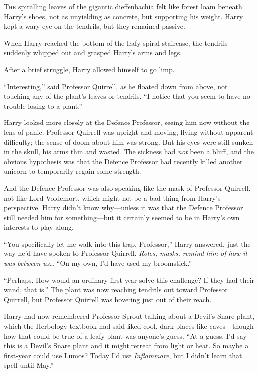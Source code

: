 
\lettrine{T}{he} spiralling leaves of the gigantic dieffenbachia felt like forest loam beneath Harry’s shoes, not as unyielding as concrete, but supporting his weight. Harry kept a wary eye on the tendrils, but they remained passive.

When Harry reached the bottom of the leafy spiral staircase, the tendrils suddenly whipped out and grasped Harry’s arms and legs.

After a brief struggle, Harry allowed himself to go limp.

“Interesting,” said Professor Quirrell, as he floated down from above, not touching any of the plant’s leaves or tendrils. “I notice that you seem to have no trouble losing to a plant.”

Harry looked more closely at the Defence Professor, seeing him now without the lens of panic. Professor Quirrell was upright and moving, flying without apparent difficulty; the sense of doom about him was strong. But his eyes were still sunken in the skull, his arms thin and wasted. The sickness had \emph{not} been a bluff, and the obvious hypothesis was that the Defence Professor had recently killed another unicorn to temporarily regain some strength.

And the Defence Professor was also speaking like the mask of Professor Quirrell, not like Lord Voldemort, which might not be a bad thing from Harry’s perspective. Harry didn’t know why—unless it was that the Defence Professor still needed him for something—but it certainly seemed to be in Harry’s own interests to play along.

“You specifically let me walk into this trap, Professor,” Harry answered, just the way he’d have spoken to Professor Quirrell. \emph{Roles, masks, remind him of how it was between us…} “On my own, I’d have used my broomstick.”

“Perhaps. How would an ordinary first-year solve this challenge? If they had their wand, that is.” The plant was now reaching tendrils out toward Professor Quirrell, but Professor Quirrell was hovering just out of their reach.

Harry had now remembered Professor Sprout talking about a Devil’s Snare plant, which the Herbology textbook had said liked cool, dark places like caves—though how that could be true of a leafy plant was anyone’s guess. “At a guess, I’d say this is a Devil’s Snare plant and it might retreat from light or heat. So maybe a first-year could use Lumos? Today I’d use \emph{Inflammare}, but I didn’t learn that spell until May.”

